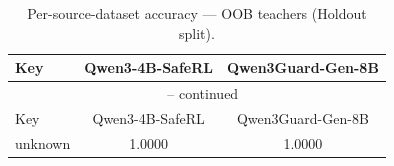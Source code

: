 \begin{landscape}
\begin{longtable}{lcc}
\caption{Per-source-dataset accuracy — OOB teachers (Holdout split).} \\
\label{tab:oob_teachers_per_dataset_holdout}
\toprule
Key & Qwen3-4B-SafeRL & Qwen3Guard-Gen-8B \\
\midrule
\endfirsthead
\multicolumn{3}{c}{\tablename\ \thetable{} -- continued} \\
\toprule
Key & Qwen3-4B-SafeRL & Qwen3Guard-Gen-8B \\
\midrule
\endhead
unknown & 1.0000 & 1.0000 \\
\bottomrule
\end{longtable}
\end{landscape}